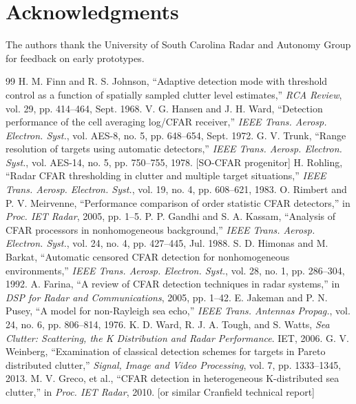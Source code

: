 \documentclass[conf]{new-aiaa}
\begin{document}
\section*{Acknowledgments}
The authors thank the University of South Carolina Radar and Autonomy Group for feedback on early prototypes.

\begin{thebibliography}{99}
 H. M. Finn and R. S. Johnson, ``Adaptive detection mode with threshold control as a function of spatially sampled clutter level estimates,'' \emph{RCA Review}, vol. 29, pp. 414--464, Sept. 1968.
 V. G. Hansen and J. H. Ward, ``Detection performance of the cell averaging log/CFAR receiver,'' \emph{IEEE Trans. Aerosp. Electron. Syst.}, vol. AES-8, no. 5, pp. 648--654, Sept. 1972.
 G. V. Trunk, ``Range resolution of targets using automatic detectors,'' \emph{IEEE Trans. Aerosp. Electron. Syst.}, vol. AES-14, no. 5, pp. 750--755, 1978. [SO-CFAR progenitor]
 H. Rohling, ``Radar CFAR thresholding in clutter and multiple target situations,'' \emph{IEEE Trans. Aerosp. Electron. Syst.}, vol. 19, no. 4, pp. 608--621, 1983.
 O. Rimbert and P. V. Meirvenne, ``Performance comparison of order statistic CFAR detectors,'' in \emph{Proc. IET Radar}, 2005, pp. 1--5.
 P. P. Gandhi and S. A. Kassam, ``Analysis of CFAR processors in nonhomogeneous background,'' \emph{IEEE Trans. Aerosp. Electron. Syst.}, vol. 24, no. 4, pp. 427--445, Jul. 1988.
 S. D. Himonas and M. Barkat, ``Automatic censored CFAR detection for nonhomogeneous environments,'' \emph{IEEE Trans. Aerosp. Electron. Syst.}, vol. 28, no. 1, pp. 286--304, 1992.
 A. Farina, ``A review of CFAR detection techniques in radar systems,'' in \emph{DSP for Radar and Communications}, 2005, pp. 1--42.
 E. Jakeman and P. N. Pusey, ``A model for non-Rayleigh sea echo,'' \emph{IEEE Trans. Antennas Propag.}, vol. 24, no. 6, pp. 806--814, 1976.
 K. D. Ward, R. J. A. Tough, and S. Watts, \emph{Sea Clutter: Scattering, the K Distribution and Radar Performance}. IET, 2006.
 G. V. Weinberg, ``Examination of classical detection schemes for targets in Pareto distributed clutter,'' \emph{Signal, Image and Video Processing}, vol. 7, pp. 1333--1345, 2013.
 M. V. Greco, et al., ``CFAR detection in heterogeneous K-distributed sea clutter,'' in \emph{Proc. IET Radar}, 2010. [or similar Cranfield technical report]

\end{thebibliography}
\end{document}
